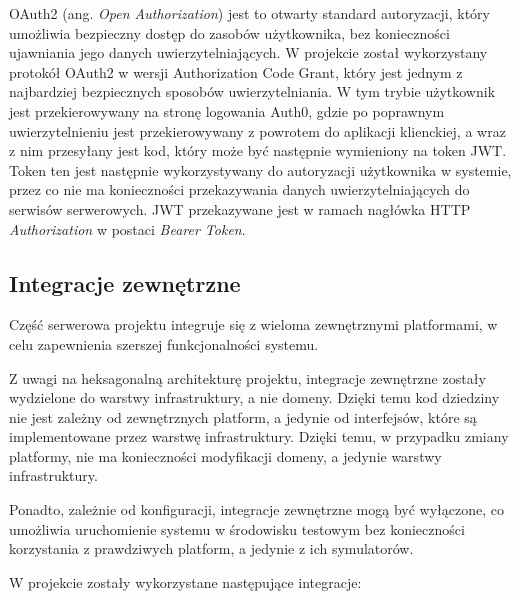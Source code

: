 OAuth2 (ang. \textit{Open Authorization}) jest to otwarty standard autoryzacji, który umożliwia bezpieczny dostęp do zasobów użytkownika, bez konieczności ujawniania jego danych uwierzytelniających. W projekcie został wykorzystany protokół OAuth2 w wersji Authorization Code Grant, który jest jednym z najbardziej bezpiecznych sposobów uwierzytelniania. W tym trybie użytkownik jest przekierowywany na stronę logowania Auth0, gdzie po poprawnym uwierzytelnieniu jest przekierowywany z powrotem do aplikacji klienckiej, a wraz z nim przesyłany jest kod, który może być następnie wymieniony na token JWT. Token ten jest następnie wykorzystywany do autoryzacji użytkownika w systemie, przez co nie ma konieczności przekazywania danych uwierzytelniających do serwisów serwerowych. JWT przekazywane jest w ramach nagłówka HTTP \textit{Authorization} w postaci \textit{Bearer Token}.

\subsection{Integracje zewnętrzne}

Część serwerowa projektu integruje się z wieloma zewnętrznymi platformami, w celu zapewnienia szerszej funkcjonalności systemu. 

Z uwagi na heksagonalną architekturę projektu, integracje zewnętrzne zostały wydzielone do warstwy infrastruktury, a nie domeny. Dzięki temu kod dziedziny nie jest zależny od zewnętrznych platform, a jedynie od interfejsów, które są implementowane przez warstwę infrastruktury. Dzięki temu, w przypadku zmiany platformy, nie ma konieczności modyfikacji domeny, a jedynie warstwy infrastruktury. 

Ponadto, zależnie od konfiguracji, integracje zewnętrzne mogą być wyłączone, co umożliwia uruchomienie systemu w środowisku testowym bez konieczności korzystania z prawdziwych platform, a jedynie z ich symulatorów.

W projekcie zostały wykorzystane następujące integracje:

